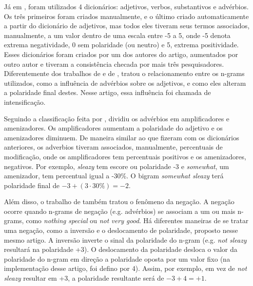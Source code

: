 \documentclass[template.tex]{subfiles}
\begin{document}
Já em , foram utilizados 4 dicionários: adjetivos, verbos, substantivos e advérbios. Os três primeiros foram criados manualmente, e o último criado automaticamente a partir do dicionário de adjetivos, mas todos eles tiveram seus termos associados, manualmente, a um valor dentro de uma escala entre -5 a 5, onde -5 denota extrema negatividade, 0 sem polaridade (ou neutro) e 5, extrema positividade. Esses dicionários foram criados por um dos autores do artigo, aumentados por outro autor e tiveram a consistência checada por mais três pesquisadores. Diferentemente dos trabalhos de  e de ,  tratou o relacionamento entre os n-grams utilizados, como a influência de advérbios sobre os adjetivos, e como eles alteram a polaridade final destes. Nesse artigo, essa influência foi chamada de intensificação.

Seguindo a classificação feita por ,  dividiu os advérbios em amplificadores e amenizadores. Os amplificadores aumentam a polaridade do adjetivo e os amenizadores diminuem. De maneira similar ao que fizeram com os dicionários anteriores, os adverbios tiveram associados, manualmente, percentuais de modificação, onde os amplificadores tem percentuais positivos e os amenizadores, negativos. Por exemplo, \textit{sleazy} tem escore ou polaridade -3 e \textit{somewhat}, um amenizador, tem percentual igual a -30\%. O bigram \textit{somewhat sleazy} terá polaridade final de $-3 + (3 \cdot 30\%) = -2$.

Além disso, o trabalho de  também tratou o fenômeno da negação. A negação ocorre quando n-grams de negação (e.g. advérbios) se associam a um ou mais n-grams, como \textit{nothing special} ou \textit{not very good}. Há diferentes maneiras de se tratar uma negação, como a inversão e o deslocamento de polaridade, proposto nesse mesmo artigo. A inversão inverte o sinal da polaridade do n-gram (e.g. \textit{not sleazy} resultará na polaridade +3). O deslocamento da polaridade 	desloca o valor da polaridade do n-gram em direção a polaridade oposta por um valor fixo (na implementação desse artigo, foi defino por 4). Assim, por exemplo, em vez de \textit{not sleazy} resultar em +3, a polaridade resultante será de $-3 + 4 = +1$.
\end{document}
